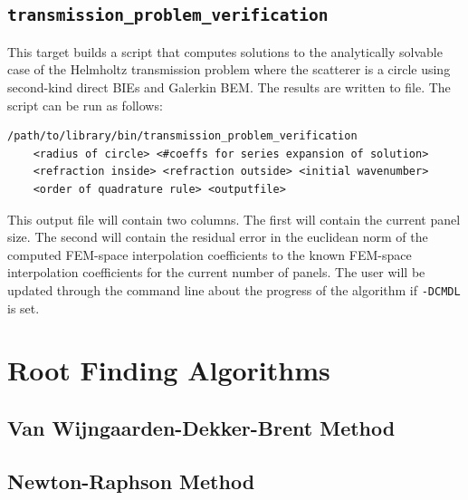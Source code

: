 \documentclass[a4paper, oneside]{discothesis}
\begin{document}
\cprotect\section{\verb|transmission_problem_verification|}
This target builds a script that computes solutions to
the analytically solvable case of the Helmholtz transmission
problem where the scatterer is a circle using second-kind direct
BIEs and Galerkin BEM.
The results are written to file.
The script can be run as follows:
\begin{verbatim}
/path/to/library/bin/transmission_problem_verification 
	<radius of circle> <#coeffs for series expansion of solution> 
	<refraction inside> <refraction outside> <initial wavenumber>
	<order of quadrature rule> <outputfile>
\end{verbatim}
This output file will contain two columns.
The first will contain the current panel size.
The second will contain the residual error in the euclidean norm of the computed FEM-space interpolation coefficients to the known FEM-space interpolation coefficients for the current number of panels.
The user will be updated through the command line about the progress of the algorithm if \verb|-DCMDL| is set.

\chapter{Root Finding Algorithms}
\section{Van Wijngaarden-Dekker-Brent Method}

\section{Newton-Raphson Method}

\end{document}

